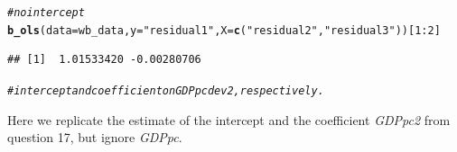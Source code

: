 \documentclass[english, 11pt]{article}\usepackage[]{graphicx}\usepackage[]{color}
\makeatletter
\newcommand{\hlnum}[1]{\textcolor[rgb]{0.686,0.059,0.569}{#1}}%
\newcommand{\hlstr}[1]{\textcolor[rgb]{0.192,0.494,0.8}{#1}}%
\newcommand{\hlcom}[1]{\textcolor[rgb]{0.678,0.584,0.686}{\textit{#1}}}%
\newcommand{\hlopt}[1]{\textcolor[rgb]{0,0,0}{#1}}%
\newcommand{\hlstd}[1]{\textcolor[rgb]{0.345,0.345,0.345}{#1}}%
\newcommand{\hlkwc}[1]{\textcolor[rgb]{0.333,0.667,0.333}{#1}}%
\newcommand{\hlkwd}[1]{\textcolor[rgb]{0.737,0.353,0.396}{\textbf{#1}}}%
\newenvironment{kframe}{%
 \def\at@end@of@kframe{}%
 \ifinner\ifhmode%
  \def\at@end@of@kframe{\end{minipage}}%
  \begin{minipage}{\columnwidth}%
 \fi\fi%
 \def\FrameCommand##1{\hskip\@totalleftmargin \hskip-\fboxsep
 \colorbox{shadecolor}{##1}\hskip-\fboxsep
     \hskip-\linewidth \hskip-\@totalleftmargin \hskip\columnwidth}%
 \MakeFramed {\advance\hsize-\width
   \@totalleftmargin\z@ \linewidth\hsize
   \@setminipage}}%
 {\par\unskip\endMakeFramed%
 \at@end@of@kframe}
\newenvironment{knitrout}{}{} %
\makeatother
\begin{document}
\begin{knitrout}
\begin{kframe}
\begin{alltt}
\hlcom{#no intercept }
\hlkwd{b_ols}\hlstd{(}\hlkwc{data} \hlstd{= wb_data,} \hlkwc{y}\hlstd{=}\hlstr{"residual1"}\hlstd{,} \hlkwc{X}\hlstd{=}\hlkwd{c}\hlstd{(}\hlstr{"residual2"}\hlstd{,} \hlstr{"residual3"}\hlstd{))[}\hlnum{1}\hlopt{:}\hlnum{2}\hlstd{]}
\end{alltt}
\begin{verbatim}
## [1]  1.01533420 -0.00280706
\end{verbatim}
\begin{alltt}
\hlcom{#intercept and coefficient on GDPpcdev2, respectively. }
\end{alltt}
\end{kframe}
\end{knitrout}

\noindent Here we replicate the estimate of the intercept and the coefficient \textit{GDPpc2} from question 17, but ignore \textit{GDPpc}. 
\end{document}
